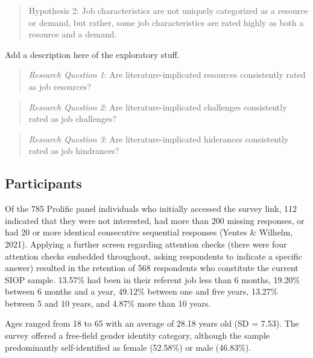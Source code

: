 \documentclass[
  english,
  man]{apa6}
\begin{document}
\begin{quote}
Hypothesis 2: Job characteristics are not uniquely categorized as a resource or demand, but rather, some job characteristics are rated highly as both a resource and a demand.
\end{quote}

Add a description here of the exploratory stuff.

\begin{quote}
\emph{Research Question 1}: Are literature-implicated resources consistently rated as job resources?
\end{quote}

\begin{quote}
\emph{Research Question 2}: Are literature-implicated challenges consistently rated as job challenges?
\end{quote}

\begin{quote}
\emph{Research Question 3}: Are literature-implicated hiderances consistently rated as job hindrances?
\end{quote}

\hypertarget{participants}{%
\subsection{Participants}\label{participants}}

Of the 785 Prolific panel individuals who initially accessed the survey link, 112 indicated that they were not interested, had more than 200 missing responses, or had 20 or more identical consecutive sequential responses (Yentes \& Wilhelm, 2021). Applying a further screen regarding attention checks (there were four attention checks embedded throughout, asking respondents to indicate a specific answer) resulted in the retention of 568 respondents who constitute the current SIOP sample. 13.57\% had been in their referent job less than 6 months, 19.20\% between 6 months and a year, 49.12\% between one and five years, 13.27\% between 5 and 10 years, and 4.87\% more than 10 years.

Ages ranged from 18 to 65 with an average of 28.18 years old (SD = 7.53). The survey offered a free-field gender identity category, although the sample predominantly self-identified as female (52.58\%) or male (46.83\%).
\end{document}

